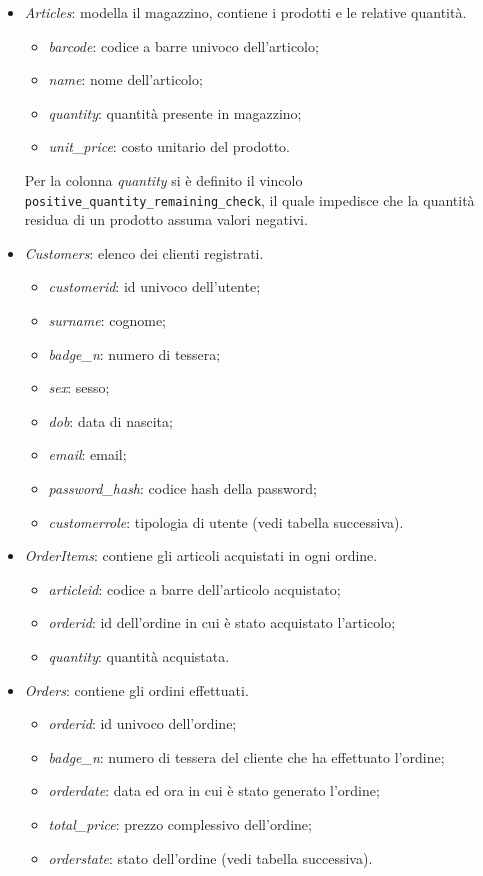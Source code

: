 	\begin{itemize}
		\item \emph{Articles}: modella il magazzino, contiene i prodotti e le relative quantità.
			\begin{itemize}
				\item \emph{barcode}: codice a barre univoco dell'articolo;
				\item \emph{name}: nome dell'articolo;
				\item \emph{quantity}: quantità presente in magazzino;
				\item \emph{unit\_price}: costo unitario del prodotto.
			\end{itemize}
			Per la colonna \emph{quantity} si è definito il vincolo \texttt{positive\_quantity\_remaining\_check}, il quale impedisce che la quantità residua di un prodotto assuma valori negativi.
			\label{sec:quantityCheck}
		
		\item \emph{Customers}: elenco dei clienti registrati.
			\begin{itemize}
				\item \emph{customerid}: id univoco dell'utente;
				\item \emph{surname}: cognome;
				\item \emph{badge\_n}: numero di tessera;
				\item \emph{sex}: sesso;
				\item \emph{dob}: data di nascita;
				\item \emph{email}: email;
				\item \emph{password\_hash}: codice hash della password;
				\item \emph{customerrole}: tipologia di utente (vedi tabella successiva).
			\end{itemize}
			
		\item \emph{OrderItems}: contiene gli articoli acquistati in ogni ordine.
			\begin{itemize}
				\item \emph{articleid}: codice a barre dell'articolo acquistato;
				\item \emph{orderid}: id dell'ordine in cui è stato acquistato l'articolo;
				\item \emph{quantity}: quantità acquistata.
			\end{itemize}
			
		\item \emph{Orders}: contiene gli ordini effettuati.
			\begin{itemize}
				\item \emph{orderid}: id univoco dell'ordine;
				\item \emph{badge\_n}: numero di tessera del cliente che ha effettuato l'ordine;
				\item \emph{orderdate}: data ed ora in cui è stato generato l'ordine;
				\item \emph{total\_price}: prezzo complessivo dell'ordine;
				\item \emph{orderstate}: stato dell'ordine (vedi tabella successiva).
			\end{itemize}
			

\end{itemize}
